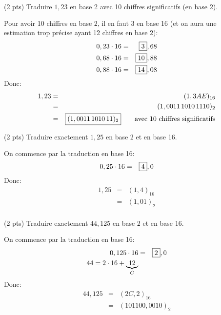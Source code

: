 
\question (2 pts) Traduire \(1,23\) en base 2 avec 10 chiffres
significatifs (en base 2).


\begin{solution}
  Pour avoir 10 chiffres en base 2, il en faut 3 en base 16 (et on
  aura une estimation trop précise ayant 12 chiffres en base 2):
  \begin{eqnarray*}
    0,23 \cdot 16 &=& \fbox{3},68\\
    0,68\cdot 16 &=& \fbox{10},88\\
    0,88\cdot 16 &=& \fbox{14},08\\
  \end{eqnarray*}
  Donc:
  \begin{eqnarray*}
    1,23 &=& (1,3AE)_{16}\\
    &=&(1,0011\,1010\,1110)_2\\
    &=&\fbox{\((1,0011\,1010\,11)_2\)}\hspace*{2em}\text{avec 10 chiffres significatifs}\\
  \end{eqnarray*}
  
\end{solution}

\question (2 pts) Traduire exactement \(1,25\) en base 2 et en base 16.


\begin{solution}
  On commence par la traduction en base 16:
  \begin{eqnarray*}
    0,25 \cdot 16 &=& \fbox{4},0\\
  \end{eqnarray*}
  Donc:
  \begin{eqnarray*}
    1,25 &=& (1,4)_{16}\\
    &=&(1,01)_2\\
  \end{eqnarray*}
  
\end{solution}


\question (2 pts) Traduire exactement \(44,125\) en base 2 et en base 16.


\begin{solution}
  On commence par la traduction en base 16:
  \begin{eqnarray*}
    0,125 \cdot 16 &=& \fbox{2},0\\
    44=2\cdot 16 + \underbrace{12}_{C}
  \end{eqnarray*}
  Donc:
  \begin{eqnarray*}
    44,125 &=& (2C,2)_{16}\\
    &=&(101100,0010)_2\\
  \end{eqnarray*}
  
\end{solution}

